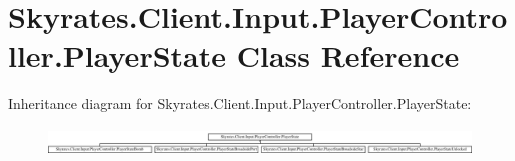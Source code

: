 \hypertarget{class_skyrates_1_1_client_1_1_input_1_1_player_controller_1_1_player_state}{\section{Skyrates.\-Client.\-Input.\-Player\-Controller.\-Player\-State Class Reference}
\label{class_skyrates_1_1_client_1_1_input_1_1_player_controller_1_1_player_state}
}
Inheritance diagram for Skyrates.\-Client.\-Input.\-Player\-Controller.\-Player\-State\-:\begin{figure}[H]
\begin{center}
\leavevmode
\includegraphics[height=0.732984cm]{class_skyrates_1_1_client_1_1_input_1_1_player_controller_1_1_player_state}
\end{center}
\end{figure}
